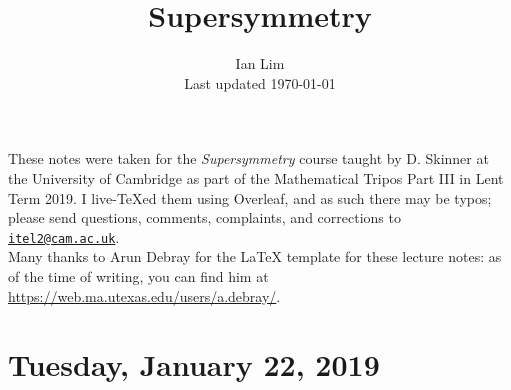 \documentclass[reqno]{amsart}
\begin{document}
\title{Supersymmetry}
\author{Ian Lim\\ Last updated \today}
\maketitle
{\small\noindent These notes were taken for the \textit{Supersymmetry} course taught by D. Skinner at the University of Cambridge as part of the Mathematical Tripos Part III in Lent Term 2019. I live-\TeX ed them using Overleaf, and as such there may be typos; please send questions, comments, complaints, and corrections to 
\href{mailto:itel2@cam.ac.uk?subject=SUSY\%20Lecture\%20Notes}{\texttt{itel2@cam.ac.uk}}.\\
Many thanks to Arun Debray for the {\LaTeX} template for these lecture notes: as of the time of writing, you can find him at \url{https://web.ma.utexas.edu/users/a.debray/}.}

\tableofcontents

\section{Tuesday, January 22, 2019}
    
\end{document}
